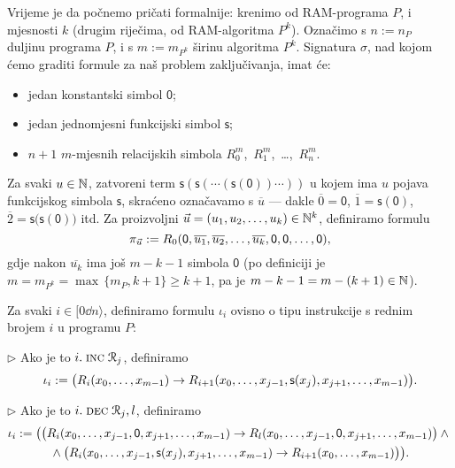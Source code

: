 Vrijeme je da počnemo pričati formalnije: krenimo od RAM-programa $P$, i mjesnosti $k$ (drugim riječima, od RAM-algoritma $P^k$). Označimo s $n:=n_P$ duljinu programa $P$, i s $m:=m_{P^k}$ širinu algoritma $P^k$. Signatura $\sigma$, nad kojom ćemo graditi formule za naš problem zaključivanja, imat će:
\begin{itemize}
    \item jedan konstantski simbol $\mathsf 0$;
    \item jedan jednomjesni funkcijski simbol $\mathsf s$;
    \item $n+1$ $m$-mjesnih relacijskih simbola $R_0^m$,~$R_1^m$,~\ldots,~$R_n^m$.
\end{itemize}

Za svaki $u\in{\mathbb N}$, zatvoreni term $\mathsf s(\mathsf s(\dotsb(\mathsf s(\mathsf0))\dotsb))$ u kojem ima $u$ pojava funkcijskog simbola $\mathsf s$, skraćeno označavamo s $\overline u$ --- dakle $\overline 0=\mathsf 0$, $\overline 1=\mathsf s(\mathsf0)$, $\overline 2=\mathsf s\bigl(\mathsf s(\mathsf0)\bigr)$ itd. Za proizvoljni $\vec u=(u_1,u_2,\dotsc,u_k)\in{\mathbb N}^k$, definiramo formulu
\begin{equation}\label{eq:defpiu}
    \pi_{\vec u}:=R_0(\mathsf0,\overline{u_1},\overline{u_2},\dotsc,\overline{u_k},\mathsf0,\mathsf0,\dotsc,\mathsf0)\text,
\end{equation}
gdje nakon $\overline{u_k}$ ima još $m-k-1$ simbola $\mathsf0$ (po definiciji je $m=m_{P^k}=\max\,\{m_P,k+1\}\ge k+1$, pa je $m-k-1=m-(k+1)\in{\mathbb N}$).

Za svaki $i\in[0\dd n\rangle$, definiramo formulu $\iota_i$ ovisno o tipu instrukcije s rednim brojem $i$ u programu $P$:
\smallskip

$\rhd$ Ako je to $i.\;\textsc{inc}\;\mathcal R_{j}$, definiramo
    \begin{equation}\label{eq:formINC}
        \iota_i:=\bigl(R_i(x_0,\dotsc,x_{m-1})\to R_{i+1}(x_0,\dotsc,x_{j-1},\mathsf s(x_j),x_{j+1},\dotsc,x_{m-1})\bigr)\text.
    \end{equation}

$\rhd$ Ako je to $i.\;\textsc{dec}\;\mathcal R_{j},l$, definiramo
    \begin{multline}\label{eq:formDEC}
        \iota_i:=\bigl(
        \bigl(
        R_i(x_0,\dotsc,x_{j-1},\mathsf0,x_{j+1},\dotsc,x_{m-1})\to R_l(x_0,\dotsc,x_{j-1},\mathsf0,x_{j+1},\dotsc,x_{m-1})
        \bigr)
        \land{}\\
        {}\land
        \bigl(
        R_i(x_0,\dotsc,x_{j-1},\mathsf s(x_j),x_{j+1},\dotsc,x_{m-1})\to R_{i+1}(x_0,\dotsc,x_{m-1})
        \bigr)
        \bigr)\text.
    \end{multline}

